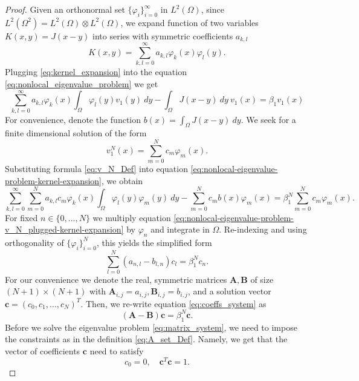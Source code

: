 \documentclass[11pt, a4paper]{article}
\theoremstyle{break}
\theoremstyle{break}
\theoremstyle{break}
\theoremstyle{break}
\theoremstyle{break}
\theoremstyle{break}
\theoremstyle{break}
\theoremstyle{break}
\theoremstyle{break}
\theoremstyle{break}
\begin{document}
\begin{proof}

    Given an orthonormal set $\{\varphi_i\}_{i=0}^\infty$ in $L^2(\Omega)$, since $L^2(\Omega^2) = L^2(\Omega) \otimes L^2(\Omega)$, we expand function of two variables $K(x,y) = J(x-y)$ into series with symmetric coefficients $a_{k,l}$
    \begin{equation}
        \label{eq:kernel_expansion}
        K(x,y) = \sum_{k,l = 0}^\infty a_{k, l} \varphi_k(x) \varphi_l(y).
    \end{equation}
    Plugging \eqref{eq:kernel_expansion} into the equation \eqref{eq:nonlocal_eigenvalue_problem} we get
    \begin{equation}
        \label{eq:nonlocal-eigenvalue-problem-kernel-expansion}
        \sum_{k, l = 0}^\infty a_{k, l} \varphi_k(x)\int_\Omega \varphi_l(y) v_1(y)\:dy - \int_\Omega J(x-y)\:dy\: v_1(x) = \beta_1 v_1(x)
    \end{equation}
    For convenience, denote the function $b(x) = \int_\Omega J(x-y)\:dy$. We seek for a finite dimensional solution of the form
    \begin{equation}
        \label{eq:v_N_Def}
        v_1^N(x) = \sum_{m=0}^N c_m \varphi_m(x).
    \end{equation}
    Substituting formula \eqref{eq:v_N_Def} into equation \eqref{eq:nonlocal-eigenvalue-problem-kernel-expansion}, we obtain
    \begin{equation}
        \label{eq:nonlocal-eigenvalue-problem-v_N_plugged-kernel-expansion}
        \sum_{k, l = 0}^\infty \sum_{m=0}^N a_{k, l} c_m \varphi_k(x)\int_\Omega \varphi_l(y) \varphi_m(y)\:dy - \sum_{m=0}^N c_m b(x) \varphi_m(x) = \beta_1^N \sum_{m=0}^N c_m \varphi_m(x).
    \end{equation}
    For fixed $n \in \{0, \ldots, N\}$ we multiply equation \eqref{eq:nonlocal-eigenvalue-problem-v_N_plugged-kernel-expansion} by $\varphi_n$ and integrate in $\Omega$. Re-indexing and using orthogonality of $\{\varphi_i\}_{i=0}^N$, this yields the simplified form
    \begin{equation}
        \label{eq:coeffs_system}
        \sum_{l=0}^N(a_{n, l} - b_{l,n}) c_l = \beta_1^N c_n.
    \end{equation}
    For our convenience we denote the real, symmetric matrices $\mathbf{A}, \mathbf{B}$ of size $(N+1) \times (N+1)$ with $\mathbf{A}_{i,j} = a_{i,j}, \mathbf{B}_{i, j} = b_{i,j}$, and a solution vector $\mathbf{c} = (c_0, c_1, \ldots, c_N)^T$. Then, we re-write equation \eqref{eq:coeffs_system} as
    \begin{equation}
        \label{eq:matrix_system}
        (\mathbf{A} - \mathbf{B}) \mathbf{c} = \beta_1^N \mathbf{c}.
    \end{equation}
    Before we solve the eigenvalue problem \eqref{eq:matrix_system}, we need to impose the constraints as in the definition \eqref{eq:A_set_Def}. Namely, we get that the vector of coefficients $\mathbf{c}$ need to satisfy
    \begin{equation}
        \label{eq:matrix_system_constraint}
        c_0 = 0, \quad \mathbf{c}^T \mathbf{c} = 1.
    \end{equation}
    

\end{proof}
\end{document}
